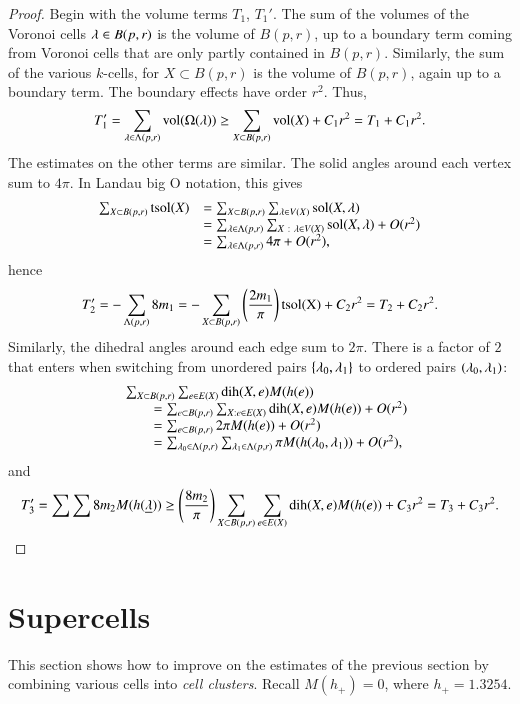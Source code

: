 \begin{proof}
Begin with the volume terms $T_1$, $T_1'$.  The sum of the volumes of the Voronoi cells $\lambda\in B(p,r)$ is the volume of $B(p,r)$, up to a boundary term coming from Voronoi cells that are only partly contained in $B(p,r)$.  Similarly, the sum of the various $k$-cells, for $X\subset B(p,r)$ is the volume of $B(p,r)$, again up to a boundary term. The boundary effects have order $r^2$. Thus,
$$
T_1'= \sum_{\lambda\in \Lambda(p,r)} {\operatorname{vol}}(\Omega(\lambda)) \ge \sum_{X\subset B(p,r)} {\operatorname{vol}}(X) + C_1 r^2 = T_1 + C_1 r^2.
$$
The estimates on the other terms are similar.  The solid angles
around each vertex sum to $4\pi$.
In Landau big O notation, this gives
$$
\begin{array}{lll}
\sum_{X\subset B(p,r)} {\operatorname{tsol}}(X) &= 
\sum_{X\subset B(p,r)} \sum_{\lambda\in V(X)} \operatorname{sol}(X,\lambda)\\
 &=\sum_{\lambda\in \Lambda(p,r)} \sum_{X\ :\  \lambda\in V(X)} \operatorname{sol}(X,\lambda) + O(r^2)\\
 &=\sum_{\lambda\in \Lambda(p,r)} 4\pi    + O(r^2),
\end{array}
$$
hence
$$
T_2' = -\sum_{\Lambda(p,r)} 8 m_1 = -\sum_{X\subset B(p,r)}\left(\frac{2m_1}\pi\right) {\operatorname{tsol(X)}} + C_2 r^2 = T_2 + C_2 r^2.
$$
Similarly, the dihedral angles around each edge sum to $2\pi$.  There is a factor of $2$ that enters when switching from unordered pairs $\{\lambda_0,\lambda_1\}$ to ordered pairs $(\lambda_0,\lambda_1)$:
$$
\begin{array}{lll}
&\sum_{X\subset B(p,r)} \sum_{e\in E(X)} \operatorname{dih}(X,e)  M(h(e)) \\
&\qquad=\sum_{e\subset B(p,r)} \sum_{X: e\in E(X)} \operatorname{dih}(X,e)  M(h(e)) +O(r^2)\\
 &\qquad=\sum_{e\subset B(p,r)} 2\pi M(h(e)) + O(r^2) \\
 &\qquad=\sum_{\lambda_0\in \Lambda(p,r)} \sum_{\lambda_1\in \Lambda(p,r) } \pi M(h(\lambda_0,\lambda_1)) + O(r^2),\\
\end{array}
$$
and 
$$
T_3' = \sum\sum 8 m_2 M(h({\underline{\lambda}})) \ge \left(\frac{8m_2}\pi\right)
\sum_{X\subset B(p,r)}\sum_{e\in E(X)}\operatorname{dih}(X,e) M(h(e)) + C_3 r^2 = T_3 + C_3 r^2.
$$
\end{proof}




\section{Supercells}

This section shows how to improve on the estimates of the previous section
by combining various cells into {\it cell clusters}.
Recall $M(h_+) = 0$, where   $h_+ = 1.3254$.

